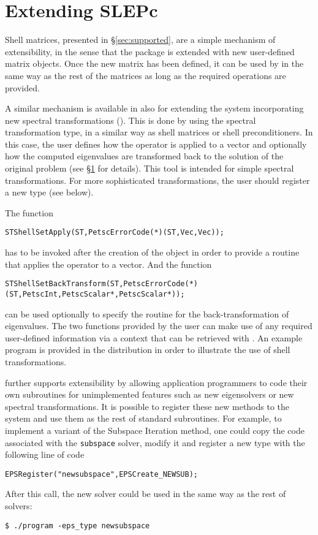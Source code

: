 \section{Extending SLEPc}
\label{sec:shell}

	Shell matrices, presented in \S\ref{sec:supported}, are a simple mechanism of extensibility, in the sense that the package is extended with new user-defined matrix objects. Once the new matrix has been defined, it can be used by \slepc in the same way as the rest of the matrices as long as the required operations are provided.

	A similar mechanism is available in \slepc also for extending the system incorporating new spectral transformations (). This is done by using the  spectral transformation type, in a similar way as shell matrices or shell preconditioners. In this case, the user defines how the operator is applied to a vector and optionally how the computed eigenvalues are transformed back to the solution of the original problem (see \S\ref{sec:shell} for details). This tool is intended for simple spectral transformations. For more sophisticated transformations, the user should register a new  type (see below).

	The function
	\begin{Verbatim}[fontsize=\small]
      STShellSetApply(ST,PetscErrorCode(*)(ST,Vec,Vec));
	\end{Verbatim}
has to be invoked after the creation of the  object in order to provide a routine that applies the operator to a vector. And the function
	\begin{Verbatim}[fontsize=\small]
      STShellSetBackTransform(ST,PetscErrorCode(*)(ST,PetscInt,PetscScalar*,PetscScalar*));
	\end{Verbatim}
can be used optionally to specify the routine for the back-transformation of eigenvalues. The two functions provided by the user can make use of any required user-defined information via a context that can be retrieved with . An example program is provided in the \slepc distribution in order to illustrate the use of shell transformations.

	\slepc further supports extensibility by allowing application programmers to code their own subroutines for unimplemented features such as new eigensolvers or new spectral transformations. It is possible to register these new methods to the system and use them as the rest of standard subroutines. For example, to implement a variant of the Subspace Iteration method, one could copy the \slepc code associated with the \texttt{subspace} solver, modify it and register a new  type with the following line of code
	\begin{Verbatim}[fontsize=\small]
	EPSRegister("newsubspace",EPSCreate_NEWSUB);
	\end{Verbatim}
After this call, the new solver could be used in the same way as the rest of \slepc solvers:
	\begin{Verbatim}[fontsize=\small]
	$ ./program -eps_type newsubspace
	\end{Verbatim}

